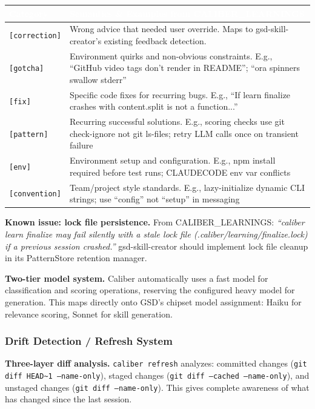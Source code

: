 \documentclass[11pt,letterpaper]{article}
\newcommand{\tableheader}[1]{\textbf{\sffamily\textcolor{white}{#1}}}
\begin{document}
\begin{center}
\begin{tabularx}{\textwidth}{L{2.5cm}X}
\toprule
{}
\tableheader{Category} & \tableheader{Semantics \& Examples from CALIBER\_LEARNINGS} \\
\midrule
\texttt{[correction]} & Wrong advice that needed user override. Maps to gsd-skill-creator's existing feedback detection. \\
\texttt{[gotcha]} & Environment quirks and non-obvious constraints. E.g., ``GitHub video tags don't render in README''; ``ora spinners swallow stderr'' \\
\texttt{[fix]} & Specific code fixes for recurring bugs. E.g., ``If learn finalize crashes with content.split is not a function...'' \\
\texttt{[pattern]} & Recurring successful solutions. E.g., scoring checks use git check-ignore not git ls-files; retry LLM calls once on transient failure \\
\texttt{[env]} & Environment setup and configuration. E.g., npm install required before test runs; CLAUDECODE env var conflicts \\
\texttt{[convention]} & Team/project style standards. E.g., lazy-initialize dynamic CLI strings; use ``config'' not ``setup'' in messaging \\
\bottomrule
\end{tabularx}
\end{center}

\textbf{Known issue: lock file persistence.} From CALIBER\_LEARNINGS: \textit{``caliber learn finalize may fail silently with a stale lock file (.caliber/learning/finalize.lock) if a previous session crashed.''} gsd-skill-creator should implement lock file cleanup in its PatternStore retention manager.

\textbf{Two-tier model system.} Caliber automatically uses a fast model for classification and scoring operations, reserving the configured heavy model for generation. This maps directly onto GSD's chipset model assignment: Haiku for relevance scoring, Sonnet for skill generation.

\subsubsection{Drift Detection / Refresh System}

\textbf{Three-layer diff analysis.} \texttt{caliber refresh} analyzes: committed changes (\texttt{git diff HEAD\textasciitilde{}1 --name-only}), staged changes (\texttt{git diff --cached --name-only}), and unstaged changes (\texttt{git diff --name-only}). This gives complete awareness of what has changed since the last session.
\end{document}

